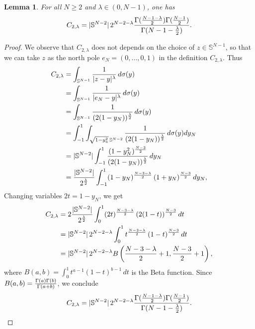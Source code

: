 \documentclass[10pt,reqno,english]{amsart}
\newtheorem{lemma}{Lemma}[section]
\theoremstyle{definition}
\numberwithin{equation}{section}
\begin{document}
\begin{lemma}
\label{lemmaC2}
For all $N\ge2$ and $\lambda\in(0,N-1)$, one has
\[
 C_{2,\lambda}=|\mathbb S^{N-2}| \, 2^{N-2 -\lambda } {\Gamma ({N-1 -\lambda \over 2}) \Gamma ({N-1 \over 2} ) \over \Gamma (N-1 -{\lambda \over 2})}.
 \]
\end{lemma}
\begin{proof}
We observe that $C_{2, \lambda}$ does not depends on the choice of $z\in\mathbb S^{N-1}$, so that we can take $z$ as the north pole $e_N=(0,\dots,0,1)$ in the definition $C_{2, \lambda}$. Thus
\begin{align*}
    C_{2,\lambda }&= \int_{\mathbb S^{N-1}}\frac{1}{|z-y|^\lambda}\,d\sigma(y)  \\
    &= \int_{\mathbb S^{N-1}}\frac{1}{|e_N-y|^\lambda}\,d\sigma(y) \\
    &= \int_{\mathbb S^{N-1}}\frac{1}{(2(1-y_N))^{\lambda \over 2}}
    \,d\sigma(y)\\
    &= \int_{-1}^1 \int_{ \sqrt{1-y_n^2} \, \mathbb S^{N-2} } \frac{1}{(2(1-y_N))^{\lambda \over 2}}
    \,d\sigma(y) dy_N\\
    &= |\mathbb S^{N-2}| \int_{-1}^1 { (1-y_N^2)^{N-3 \over 2} \over (2(1-y_N))^{\lambda \over 2}} \, dy_N \\
    &= {|\mathbb S^{N-2}| \over 2^{\lambda \over  2} }\int_{-1}^1 (1-y_N)^{N-3 -\lambda \over 2}  \, (1+y_N)^{N-3 \over 2}  \, dy_N,
 \end{align*}
Changing variables $2t= 1-y_N$, we get
\begin{align*}
    C_{2,\lambda }&=2 {|\mathbb S^{N-2}| \over 2^{\lambda \over  2} }\int_{0}^1 (2t)^{N-3 -\lambda \over 2}  \, (2(1-t))^{N-3 \over 2}  \, dt\\
    &=|\mathbb S^{N-2}| \, 2^{N-2 -\lambda }\int_{0}^1 t^{N-3 -\lambda \over 2}  \, (1-t)^{N-3 \over 2}  \, dt \\
    &= |\mathbb S^{N-2}| \, 2^{N-2 -\lambda } B\left({N-3 -\lambda \over 2} +1, {N-3 \over 2}  +1\right),
\end{align*}
where $B(a,b)= \int_0^1 t^{a-1} (1-t)^{b-1}\, dt$ is the Beta function. Since $B(a,b)={\Gamma (a) \Gamma (b) \over \Gamma (a+b)}$, we conclude
\[
    C_{2,\lambda }= |\mathbb S^{N-2}| \, 2^{N-2 -\lambda } {\Gamma ({N-1 -\lambda \over 2}) \Gamma ({N-1 \over 2} ) \over \Gamma (N-1 -{\lambda \over 2})}.\qedhere
    \]
\end{proof}
\end{document}
